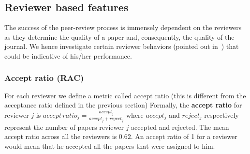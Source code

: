 \subsection{Reviewer based features}
\label{reviewer_analysis}

The success of the peer-review process is immensely dependent on the reviewers as they determine the quality of a paper and, consequently, the quality of the journal. We hence investigate certain reviewer behaviors (pointed out in~\cite{sikdar2016anomalies}) that could  be indicative of his/her performance.

\subsubsection{Accept ratio (RAC)} For each reviewer we define a metric called accept ratio (this is different from the acceptance ratio defined in the previous section) Formally, the {\bf accept ratio} for reviewer $j$ is $accept\,ratio_{j}=\frac{accept_{j}}{accept_{j} + reject_{j}}$ 
where $accept_{j}$ and $reject_{j}$ respectively represent the number of papers reviewer $j$ accepted and rejected. The mean accept ratio across all the reviewers is $0.62$. An accept ratio of 1 for a reviewer would mean that he accepted all the papers that were assigned to him.

